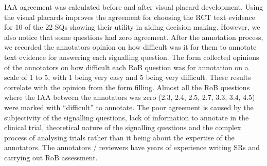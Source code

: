 \documentclass[sn-mathphys,Numbered]{sn-jnl}%
\theoremstyle{thmstyleone}%
\theoremstyle{thmstyletwo}%
\theoremstyle{thmstylethree}%
\begin{document}
IAA agreement was calculated before and after visual placard development.
Using the visual placards improves the agreement for choosing the RCT text evidence for 10 of the 22 SQs showing their utility in aiding decision making.
However, we also notice that some questions had zero agreement.
After the annotation process, we recorded the annotators opinion on how difficult was it for them to annotate text evidence for answering each signalling question.
The form collected opinions of the annotators on how difficult each RoB question was for annotation on a scale of 1 to 5, with 1 being very easy and 5 being very difficult.
These results correlate with the opinion from the form filling.
Almost all the RoB questions where the IAA between the annotators was zero (2.3, 2.4, 2.5, 2.7, 3.3, 3.4, 4.5) were marked with ``difficult'' to annotate.
The poor agreement is caused by the subjectivity of the signalling questions, lack of information to annotate in the clinical trial, theoretical nature of the signalling questions and the complex process of analysing trials rather than it being about the expertise of the annotators.
The annotators / reviewers have years of experience writing SRs and carrying out RoB assessment.
\end{document}
